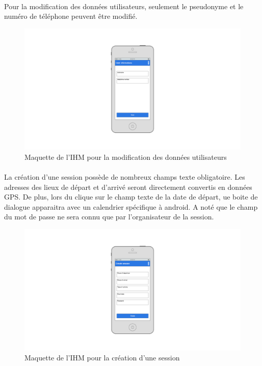 \documentclass[titlepage, 12pt]{report}
\begin{document}
\clearpage

\paragraph{}Pour la modification des données utilisateurs, seulement le pseudonyme et le numéro de téléphone peuvent être modifié.

\begin{figure}[!h]
	\caption{Maquette de l'IHM pour la modification des données utilisateurs}
	\label{modify_user_account}
	\centering
	\includegraphics[scale=0.3]{images/mockups/modify_user_profile.png}
\end{figure}

\clearpage

\paragraph{}La création d'une session possède de nombreux champs texte obligatoire. Les adresses des lieux de départ et d'arrivé seront directement convertis en données GPS. De plus, lors du clique sur le champ texte de la date de départ, ue boite de dialogue apparaitra avec un calendrier spécifique à android. A noté que le champ du mot de passe ne sera connu que par l'organisateur de la session.

\begin{figure}[!h]
	\caption{Maquette de l'IHM pour la création d'une session}
	\label{create_session}
	\centering
	\includegraphics[scale=0.3]{images/mockups/create_session.png}
\end{figure}
\end{document}
